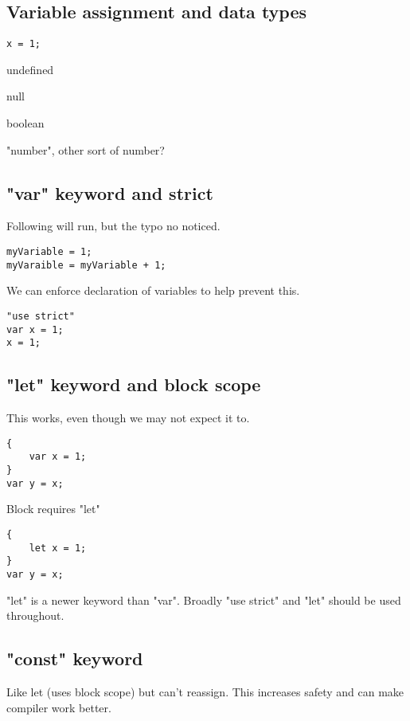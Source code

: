 

\subsection{Variable assignment and data types}

\begin{verbatim}
x = 1;
\end{verbatim}

undefined

null

boolean

"number", other sort of number?


\subsection{"var" keyword and strict}

Following will run, but the typo no noticed.
\begin{verbatim}
myVariable = 1;
myVaraible = myVariable + 1;
\end{verbatim}

We can enforce declaration of variables to help prevent this.

\begin{verbatim}
"use strict"
var x = 1;
x = 1;
\end{verbatim}

\subsection{"let" keyword and block scope}

This works, even though we may not expect it to.
\begin{verbatim}
{
    var x = 1;
}
var y = x;
\end{verbatim}

Block requires "let"

\begin{verbatim}
{
    let x = 1;
}
var y = x;
\end{verbatim}


"let" is a newer keyword than "var". Broadly "use strict" and "let" should be used throughout.

\subsection{"const" keyword}

Like let (uses block scope) but can't reassign.
This increases safety and can make compiler work better.

